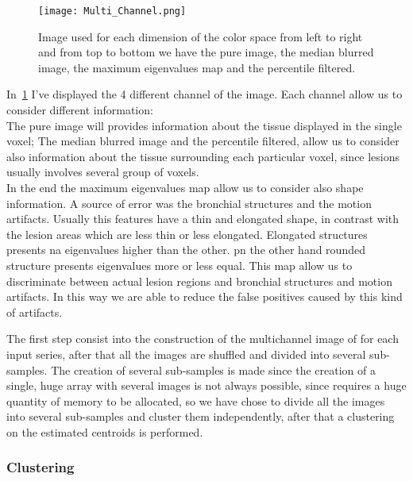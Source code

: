 		\begin{figure}[h]
			\centering
				\texttt{[image: Multi\_Channel.png]}
			\label{fig:MultiChannel}\caption{Image used for each dimension of the color space from left to right and from top to bottom we have the pure image, the median blurred image, the maximum eigenvalues map  and the percentile filtered.}
		\end{figure}
	
		In \figurename\,\ref{fig:MultiChannel} I've displayed the 4 different channel of the image. Each channel allow us to consider different information:\\ 
		The pure image will provides information about the tissue displayed in the single voxel; 
		The median blurred image and the percentile filtered, allow us to consider also information about the tissue surrounding each particular voxel, since lesions usually involves several group of voxels.\\
		In the end the maximum eigenvalues map allow us to consider also shape information. A source of error was the bronchial structures and the motion artifacts. Usually this features have a thin and elongated shape, in contrast with the lesion areas which are less thin or less elongated. Elongated structures presents na eigenvalues higher than the other. pn the other hand rounded structure presents eigenvalues more or less equal. This map allow us to discriminate between actual lesion regions and bronchial structures and motion artifacts.  In this way we are able to reduce the false positives caused by this kind of artifacts.
		
		The first step consist into the construction of the multichannel image of for each input series, after that all the images are shuffled and divided into several sub-samples. The creation of several sub-samples is made since the creation of a single, huge array with several images is not always possible, since requires a huge quantity of memory to be allocated, so we have chose to divide all the images into several sub-samples and cluster them independently, after that a clustering on the estimated centroids is performed.\\

		
		\subsubsection*{Clustering} 
		
